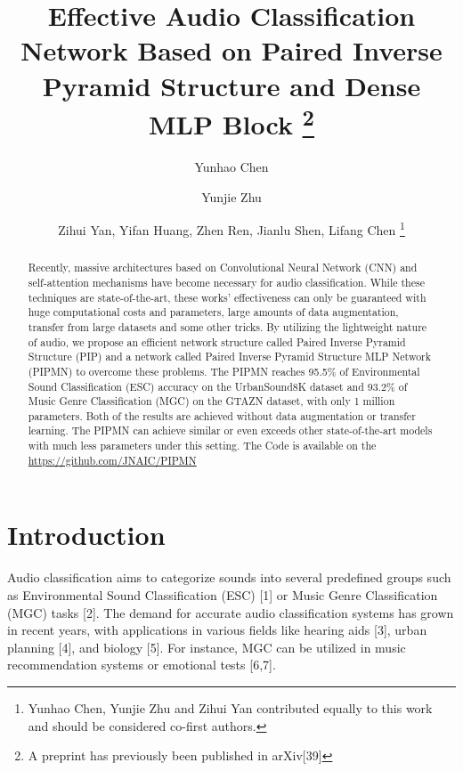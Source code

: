 \documentclass[runningheads]{llncs}
\begin{document}
\title{Effective Audio Classification Network Based on Paired Inverse Pyramid Structure and Dense MLP Block \thanks{A preprint has previously been published in arXiv[39] }}
\author{Yunhao Chen \and
Yunjie Zhu \and
Zihui Yan,
Yifan Huang,
Zhen Ren,
Jianlu Shen,
Lifang Chen
\thanks{Yunhao Chen, Yunjie Zhu and Zihui Yan contributed equally to this work and should be considered co-first authors.}}
\maketitle              \begin{abstract}

Recently, massive architectures based on Convolutional Neural Network (CNN) and self-attention mechanisms have become necessary for audio classification. While these techniques are state-of-the-art, these works’ effectiveness can only be guaranteed with huge computational costs and parameters, large amounts of data augmentation, transfer from large datasets and some other tricks. By utilizing the lightweight nature of audio, we propose an efficient network structure called Paired Inverse Pyramid Structure (PIP) and a network called Paired Inverse Pyramid Structure MLP Network (PIPMN) to overcome these problems. The PIPMN reaches 95.5\% of Environmental Sound Classification (ESC) accuracy on the UrbanSound8K dataset and 93.2\% of Music Genre Classification (MGC) on the GTAZN dataset, with only 1 million parameters. Both of the results are achieved without data augmentation or transfer learning. The PIPMN can achieve similar or even exceeds other state-of-the-art models with much less parameters under this setting. The Code is available on the \url{https://github.com/JNAIC/PIPMN}

\end{abstract}


\section{Introduction}
\label{sec:intro}


Audio classification aims to categorize sounds into several predefined groups such as Environmental Sound Classification (ESC) [1] or Music Genre Classification (MGC) tasks [2]. The demand for accurate audio classification systems has grown in recent years, with applications in various fields like hearing aids [3], urban planning [4], and biology [5]. For instance, MGC can be utilized in music recommendation systems or emotional tests [6,7].
\end{document}
